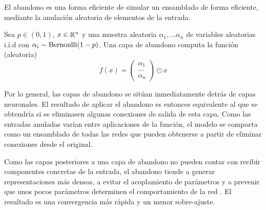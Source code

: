 El abandono es una forma eficiente de simular un ensamblado de forma eficiente, mediante la anulación aleatoria de elementos de la entrada. 
\begin{definition}
    Sea \( p \in (0, 1) \), \( x \in \mathbb{R}^{n} \) y  una muestra aleatoria \( \alpha_{1}, … \alpha_{n} \) de variables aleatorias i.i.d con \( \alpha_{i} \sim \operatorname{Bernoulli}(1-p) \). Una capa de abandono computa la función (aleatoria)
    \[
        f(x) = \begin{pmatrix} \alpha_{1} \\
        … \\
        \alpha_{n}
        \end{pmatrix} \odot x
    \]
\end{definition}

Por lo general, las capas de abandono se sitúan inmediatamente detrás de capas neuronales. El resultado de aplicar el abandono es entonces equivalente al que se obtendría si se eliminasen algunas conexiones de salida de esta capa. Como las entradas anuladas varían entre aplicaciones de la función, el modelo se comporta como un ensamblado  de todas las redes que pueden obtenerse a partir de eliminar conexiones desde el original.

Como las capas posteriores a una capa de abandono no pueden contar con recibir componentes concretas de la entrada, el abandono tiende a generar representaciones más densas, a evitar el acoplamiento de parámetros y a prevenir que unos pocos parámetros determinen el comportamiento de la red \cite{srivastava2014dropout}. El resultado es una convergencia más rápida y un menor sobre-ajuste. 